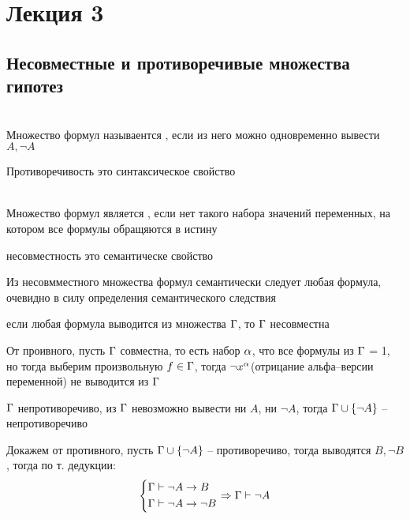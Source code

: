 \section{Лекция 3}
\subsection{Несовместные и противоречивые множества гипотез}
\begin{definition}  \\
Множество формул называентся , если из него можно одновременно вывести $A, \neg A$ 
\end{definition}
\begin{remark}
Противоречивость это синтаксическое свойство
\end{remark}
\begin{definition}  \\
Множество формул является  , если нет такого набора значений переменных, на котором все формулы обращяются в истину
\end{definition}
\begin{remark}
несовместность это семантическе свойство
\end{remark}
\begin{remark}
Из несовмместного множества формул семантически следует любая формула, очевидно в силу определения семантического следствия
\end{remark}
\begin{lemma}
если любая формула выводится из множества $\Gamma$, то $\Gamma$ несовместна
\end{lemma}
\beginproof
От проивного, пусть $\Gamma$ совместна, то есть набор $\alpha$, что все формулы из $\Gamma$ = 1, но тогда выберим произвольную $f \in \Gamma$, тогда $\neg x^{\alpha}$(отрицание альфа--версии переменной) не выводится из $\Gamma$
\begin{lemma} \label{lem:consistent_set_and_union}
$\Gamma$ непротиворечиво, из $\Gamma$ невозможно вывести ни $A$, ни $\neg A$, тогда $\Gamma \cup \left\{ \neg A \right\} $ -- непротиворечиво
\end{lemma}
Докажем от противного, пусть $\Gamma \cup \left\{ \neg A \right\} $ -- противоречиво, тогда выводятся $B , \neg B$, тогда по т. дедукции: \begin{equation}
 \left\{    \begin{aligned}
    &\Gamma \vdash \neg A \to B \\
    &\Gamma \vdash \neg A \to \neg B
    \end{aligned} \right. \Rightarrow \Gamma \vdash \neg A
\end{equation}
